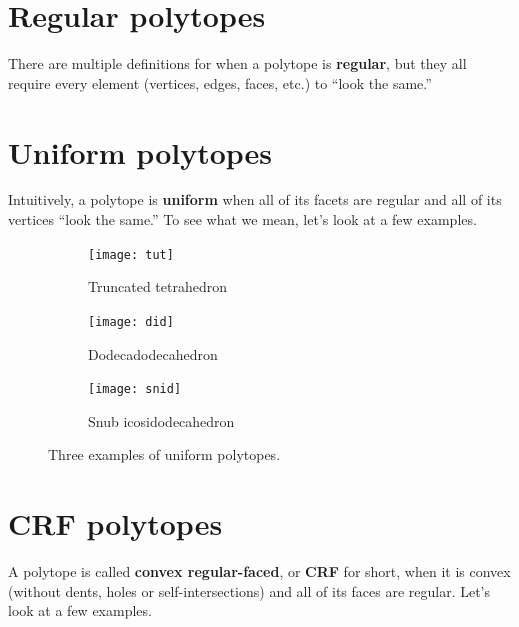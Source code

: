 \documentclass{article}
\begin{document}
\section{Regular polytopes}
There are multiple definitions for when a polytope is \textbf{regular},
but they all require every element (vertices, edges, faces, etc.) to ``look the same.''

\section{Uniform polytopes}
Intuitively, a polytope is \textbf{uniform}
when all of its facets are regular and all of its vertices ``look the same.''
To see what we mean, let's look at a few examples.

\begin{figure}[h]
  \centering
  \begin{subfigure}{.33333\textwidth}
    \centering
    \texttt{[image: tut]}
    \caption{Truncated tetrahedron}
    \label{fig:tut}
  \end{subfigure}%
  \begin{subfigure}{.33333\textwidth}
    \centering
    \texttt{[image: did]}
    \caption{Dodecadodecahedron}
    \label{fig:did}
  \end{subfigure}%
  \begin{subfigure}{.33333\textwidth}
    \centering
    \texttt{[image: snid]}
    \caption{Snub icosidodecahedron}
    \label{fig:snid}
  \end{subfigure}%
  \caption{Three examples of uniform polytopes.}
  \label{fig:uniforms3D}
\end{figure}

\section{CRF polytopes}
A polytope is called \textbf{convex regular-faced}, or \textbf{CRF} for short, when it is convex (without dents, holes or self-intersections) and all of its faces are regular. Let's look at a few examples.
\end{document}
